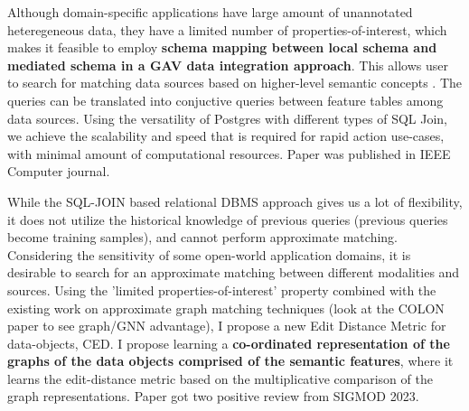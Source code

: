 



Although domain-specific applications have large amount of unannotated heteregeneous data, they have a limited number of properties-of-interest,
which makes it feasible to employ \textbf{schema mapping between local schema and mediated schema in a GAV data integration approach}. This allows user to search for matching data sources based on higher-level semantic concepts \cite{solaiman2021applying}. The queries can be translated into conjuctive queries between feature tables among data sources. Using the versatility of Postgres with different types of SQL Join, we achieve the scalability and speed that is required for rapid action use-cases, with minimal amount of computational resources. Paper was published in IEEE Computer journal.

While the SQL-JOIN based relational DBMS approach gives us a lot of flexibility, it does not utilize the historical knowledge of previous queries (previous queries become training samples), and cannot perform approximate matching. Considering the sensitivity of some open-world application domains, it is desirable to search for an approximate matching between different modalities and sources. 
Using the 'limited properties-of-interest' property combined with the existing work on approximate graph matching techniques (look at the COLON paper to see graph/GNN advantage), 
I propose a new Edit Distance Metric for data-objects, CED. 
I propose learning a \textbf{co-ordinated representation of the graphs of the data objects comprised of the semantic features}, where it learns the edit-distance metric based on the multiplicative comparison of the graph representations. 
Paper got two positive review from SIGMOD 2023.


